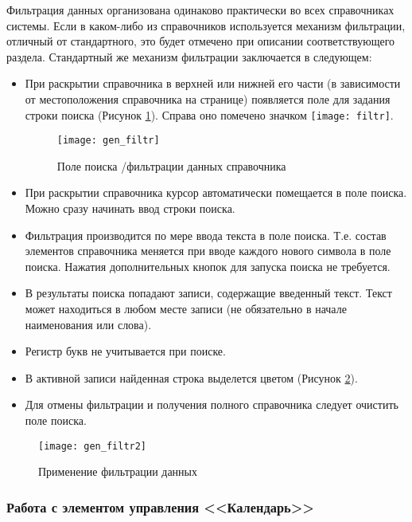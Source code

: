 Фильтрация данных организована одинаково практически во всех справочниках системы. Если в каком-либо из справочников используется механизм фильтрации, отличный от стандартного, это будет отмечено при описании соответствующего раздела. Стандартный же механизм фильтрации заключается в следующем:
\begin{itemize}
 \item При раскрытии справочника в верхней или нижней его части (в зависимости от местоположения справочника на странице) появляется поле для задания строки поиска (Рисунок \ref{img_gen_filtr}). Справа оно помечено значком \texttt{[image: filtr]}.
 
 \begin{figure}[!ht]\centering
 	\texttt{[image: gen\_filtr]}
 	\caption{Поле поиска \slash фильтрации данных справочника}
 	\label{img_gen_filtr}
 \end{figure} 
 
 \item При раскрытии справочника курсор автоматически помещается в поле поиска. Можно сразу начинать ввод строки поиска.
 \item Фильтрация производится по мере ввода текста в поле поиска. Т.е. состав элементов справочника меняется при вводе каждого нового символа в поле поиска. Нажатия дополнительных кнопок для запуска поиска не требуется.
 \item В результаты поиска попадают записи, содержащие введенный текст. Текст может находиться в любом месте записи (не обязательно в начале наименования или слова).
 \item Регистр букв не учитывается при поиске.
 \item В активной записи найденная строка выделется цветом (Рисунок \ref{img_gen_filtr2}).
 \item Для отмены фильтрации и получения полного справочника следует очистить поле поиска.
\end{itemize} 

\begin{figure}[!ht]\centering
	\texttt{[image: gen\_filtr2]}
	\caption{Применение фильтрации данных}
	\label{img_gen_filtr2}
\end{figure}  

\subsubsection{Работа с элементом управления <<Календарь>>} \label{gen_cal}

